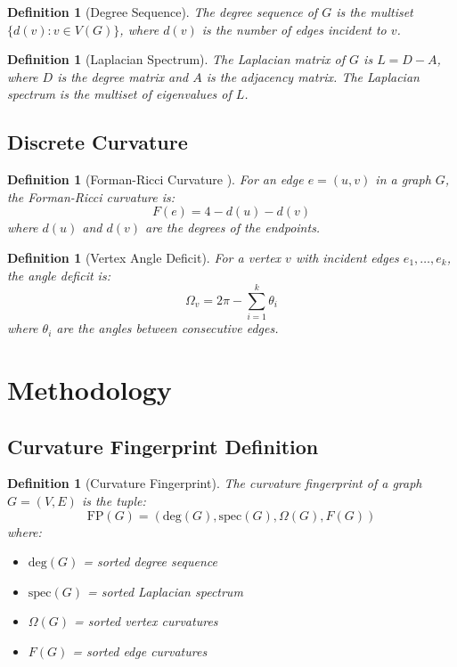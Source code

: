 \documentclass[12pt,a4paper]{article}
\newtheorem{definition}[theorem]{Definition}
\begin{document}
\begin{definition}[Degree Sequence]
The \textit{degree sequence} of $G$ is the multiset $\{d(v) : v \in V(G)\}$, where $d(v)$ is the number of edges incident to $v$.
\end{definition}

\begin{definition}[Laplacian Spectrum]
The \textit{Laplacian matrix} of $G$ is $L = D - A$, where $D$ is the degree matrix and $A$ is the adjacency matrix. The \textit{Laplacian spectrum} is the multiset of eigenvalues of $L$.
\end{definition}

\subsection{Discrete Curvature}

\begin{definition}[Forman-Ricci Curvature \citep{forman2003}]
For an edge $e = (u,v)$ in a graph $G$, the Forman-Ricci curvature is:
$$F(e) = 4 - d(u) - d(v)$$
where $d(u)$ and $d(v)$ are the degrees of the endpoints.
\end{definition}

\begin{definition}[Vertex Angle Deficit]
For a vertex $v$ with incident edges $e_1, \ldots, e_k$, the angle deficit is:
$$\Omega_v = 2\pi - \sum_{i=1}^k \theta_i$$
where $\theta_i$ are the angles between consecutive edges.
\end{definition}

\section{Methodology}

\subsection{Curvature Fingerprint Definition}

\begin{definition}[Curvature Fingerprint]
The \textit{curvature fingerprint} of a graph $G = (V,E)$ is the tuple:
$$\text{FP}(G) = \left(\text{deg}(G), \text{spec}(G), \Omega(G), F(G)\right)$$
where:
\begin{itemize}
  \item $\text{deg}(G)$ = sorted degree sequence
  \item $\text{spec}(G)$ = sorted Laplacian spectrum
  \item $\Omega(G)$ = sorted vertex curvatures
  \item $F(G)$ = sorted edge curvatures
\end{itemize}
\end{definition}
\end{document}
